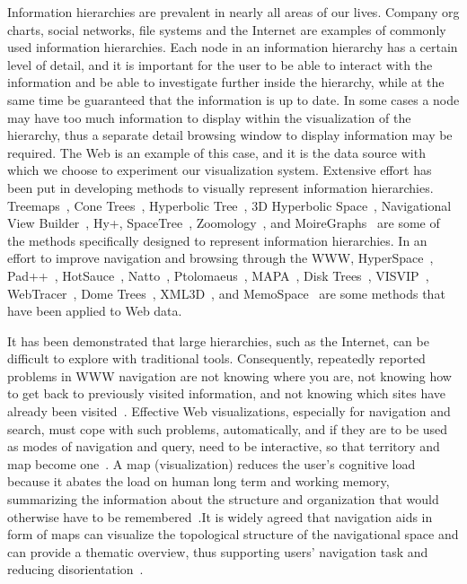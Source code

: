 \documentclass[]{article}
\begin{document}
Information hierarchies are prevalent in nearly all areas of our lives. Company org charts, social networks, file systems and the Internet are examples of commonly used information hierarchies. Each node in an information hierarchy has a certain level of detail, and it is important for the user to be able to interact with the information and be able to investigate further inside the hierarchy, while at the same time be guaranteed that the information is up to date. In some cases a node may have too much information to display within the visualization of the hierarchy, thus a separate detail browsing window to display information may be required. The Web is an example of this case, and it is the data source with which we choose to experiment our visualization system. Extensive effort has been put in developing methods to visually represent information hierarchies. Treemaps~\cite{bs-91}, Cone Trees~\cite{rms91}, Hyperbolic Tree~\cite{lrp-95}, 3D Hyperbolic Space~\cite{mb-95}, Navigational View Builder~\cite{mf-95}, Hy+\cite{hmv-95}, SpaceTree~\cite{pgb02}, Zoomology~\cite{hdrw-03}, and MoireGraphs~\cite{km-03} are some of the methods specifically designed to represent information hierarchies. In an effort to improve navigation and browsing through the WWW, HyperSpace~\cite{wdbh-95}, Pad++~\cite{b96}, HotSauce~\cite{g02}, Natto~\cite{sm97}, Ptolomaeus~\cite{blv98}, MAPA~\cite{dk98}, Disk Trees~\cite{cpmpg-98}, VISVIP~\cite{cs-99}, WebTracer~\cite{webtracer}, Dome Trees~\cite{cpp-00}, XML3D~\cite{rcmc-00}, and MemoSpace~\cite{wls05} are some methods that have been applied to Web data.

It has been demonstrated that large hierarchies, such as the Internet, can be difficult to explore with traditional tools. Consequently, repeatedly reported problems in WWW navigation are not knowing where you are, not knowing how to get back to previously visited information, and not knowing which sites have already been visited~\cite{eh-89, wls05}. Effective Web visualizations, especially for navigation and search, must cope with such problems, automatically, and if they are to be used as modes of navigation and query, need to be interactive, so that territory and map become one~\cite{atlas}. A map (visualization) reduces the user's cognitive load because it abates the load on human long term and working memory, summarizing the information about the structure and organization that would otherwise have to be remembered~\cite{a-97, cr-96,jh-02, hsc-97, w-91}.It is widely agreed that navigation aids in form of maps can visualize the topological structure of the navigational space and can provide a thematic overview, thus supporting users' navigation task and reducing disorientation~\cite{cr-96,jh-02}.
\end{document}
